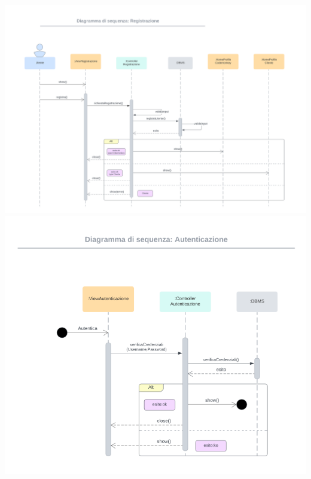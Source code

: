 \includegraphics[width=1\textwidth]{assets/img/sequenza_dettaglio/accesso-1.png}\\
\includegraphics[width=1\textwidth]{assets/img/sequenza_dettaglio/accesso-2.png}\\
